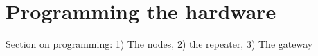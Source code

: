\section{Programming the hardware}

Section on programming: 1) The nodes, 2) the repeater, 3) The gateway